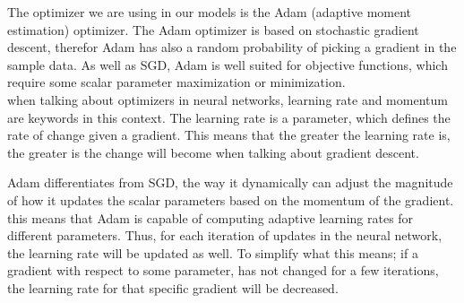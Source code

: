 The optimizer we are using in our models is the Adam (adaptive moment estimation)  optimizer. The Adam optimizer is based on stochastic gradient descent\cite{adam}, therefor Adam has also a random probability of picking a gradient in the sample data. As well as SGD, Adam is well suited for objective functions, which require some scalar parameter maximization or minimization. \\

\noindent
when talking about optimizers in neural networks, learning rate and momentum are keywords in this context. The learning rate is a parameter, which defines the rate of change given a gradient. This means that the greater the learning rate is, the greater is the change will become when talking about gradient descent.

\noindent
Adam differentiates from SGD, the way it dynamically can adjust the magnitude of how it updates the scalar parameters based on the momentum of the gradient. this means that Adam is capable of computing adaptive learning rates for different parameters\cite{adam}. Thus, for each iteration of updates in the neural network, the learning rate will be updated as well. To simplify what this means; if a gradient with respect to some parameter, has not changed for a few iterations, the learning rate for that specific gradient will be decreased.